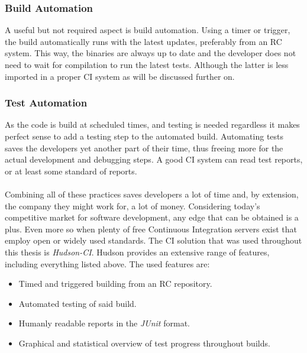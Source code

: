 \documentclass[11pt,british]{article}
\begin{document}
\subsubsection{Build Automation}
A useful but not required aspect is build automation. Using a timer or trigger, the build automatically runs with the latest updates, preferably from an RC system. This way, the binaries are always up to date and the developer does not need to wait for compilation to run the latest tests. Although the latter is less imported in a proper CI system as will be discussed further on. 

\subsubsection{Test Automation}
As the code is build at scheduled times, and testing is needed regardless it makes perfect sense to add a testing step to the automated build. Automating tests saves the developers yet another part of their time, thus freeing more for the actual development and debugging steps. A good CI system can read test reports, or at least some standard of reports. 
\\
\\
Combining all of these practices saves developers a lot of time and, by extension, the company they might work for, a lot of money. Considering today's competitive market for software development, any edge that can be obtained is a plus. Even more so when plenty of free Continuous Integration servers exist that employ open or widely used standards. The CI solution that was used throughout this thesis is \emph{Hudson-CI}. Hudson provides an extensive range of features, including everything listed above. The used features are:
\begin{itemize}
\item Timed and triggered building from an RC repository.
\item Automated testing of said build.
\item Humanly readable reports in the \emph{JUnit} format.
\item Graphical and statistical overview of test progress throughout builds.
\end{itemize}
\end{document}
